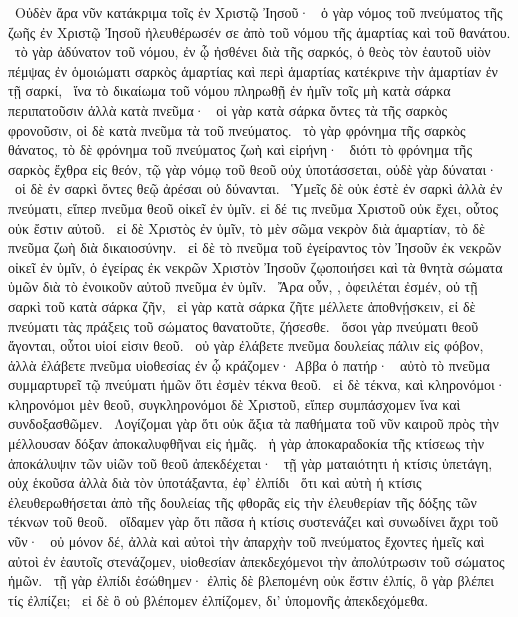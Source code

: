 ~Οὐδὲν ἄρα νῦν κατάκριμα τοῖς ἐν Χριστῷ Ἰησοῦ·
~ὁ γὰρ νόμος τοῦ πνεύματος τῆς ζωῆς ἐν Χριστῷ Ἰησοῦ ἠλευθέρωσέν σε ἀπὸ τοῦ νόμου τῆς ἁμαρτίας καὶ τοῦ θανάτου.
~τὸ γὰρ ἀδύνατον τοῦ νόμου, ἐν ᾧ ἠσθένει διὰ τῆς σαρκός, ὁ θεὸς τὸν ἑαυτοῦ υἱὸν πέμψας ἐν ὁμοιώματι σαρκὸς ἁμαρτίας καὶ περὶ ἁμαρτίας κατέκρινε τὴν ἁμαρτίαν ἐν τῇ σαρκί,
~ἵνα τὸ δικαίωμα τοῦ νόμου πληρωθῇ ἐν ἡμῖν τοῖς μὴ κατὰ σάρκα περιπατοῦσιν ἀλλὰ κατὰ πνεῦμα·
~οἱ γὰρ κατὰ σάρκα ὄντες τὰ τῆς σαρκὸς φρονοῦσιν, οἱ δὲ κατὰ πνεῦμα τὰ τοῦ πνεύματος.
~τὸ γὰρ φρόνημα τῆς σαρκὸς θάνατος, τὸ δὲ φρόνημα τοῦ πνεύματος ζωὴ καὶ εἰρήνη·
~διότι τὸ φρόνημα τῆς σαρκὸς ἔχθρα εἰς θεόν, τῷ γὰρ νόμῳ τοῦ θεοῦ οὐχ ὑποτάσσεται, οὐδὲ γὰρ δύναται·
~οἱ δὲ ἐν σαρκὶ ὄντες θεῷ ἀρέσαι οὐ δύνανται.
~Ὑμεῖς δὲ οὐκ ἐστὲ ἐν σαρκὶ ἀλλὰ ἐν πνεύματι, εἴπερ πνεῦμα θεοῦ οἰκεῖ ἐν ὑμῖν. εἰ δέ τις πνεῦμα Χριστοῦ οὐκ ἔχει, οὗτος οὐκ ἔστιν αὐτοῦ.
~εἰ δὲ Χριστὸς ἐν ὑμῖν, τὸ μὲν σῶμα νεκρὸν διὰ ἁμαρτίαν, τὸ δὲ πνεῦμα ζωὴ διὰ δικαιοσύνην.
~εἰ δὲ τὸ πνεῦμα τοῦ ἐγείραντος τὸν Ἰησοῦν ἐκ νεκρῶν οἰκεῖ ἐν ὑμῖν, ὁ ἐγείρας ἐκ νεκρῶν Χριστὸν Ἰησοῦν ζῳοποιήσει καὶ τὰ θνητὰ σώματα ὑμῶν διὰ τὸ ἐνοικοῦν αὐτοῦ πνεῦμα ἐν ὑμῖν.
~Ἄρα οὖν, , ὀφειλέται ἐσμέν, οὐ τῇ σαρκὶ τοῦ κατὰ σάρκα ζῆν,
~εἰ γὰρ κατὰ σάρκα ζῆτε μέλλετε ἀποθνῄσκειν, εἰ δὲ πνεύματι τὰς πράξεις τοῦ σώματος θανατοῦτε, ζήσεσθε.
~ὅσοι γὰρ πνεύματι θεοῦ ἄγονται, οὗτοι υἱοί εἰσιν θεοῦ.
~οὐ γὰρ ἐλάβετε πνεῦμα δουλείας πάλιν εἰς φόβον, ἀλλὰ ἐλάβετε πνεῦμα υἱοθεσίας ἐν ᾧ κράζομεν· Αββα ὁ πατήρ·
~αὐτὸ τὸ πνεῦμα συμμαρτυρεῖ τῷ πνεύματι ἡμῶν ὅτι ἐσμὲν τέκνα θεοῦ.
~εἰ δὲ τέκνα, καὶ κληρονόμοι· κληρονόμοι μὲν θεοῦ, συγκληρονόμοι δὲ Χριστοῦ, εἴπερ συμπάσχομεν ἵνα καὶ συνδοξασθῶμεν.
~Λογίζομαι γὰρ ὅτι οὐκ ἄξια τὰ παθήματα τοῦ νῦν καιροῦ πρὸς τὴν μέλλουσαν δόξαν ἀποκαλυφθῆναι εἰς ἡμᾶς.
~ἡ γὰρ ἀποκαραδοκία τῆς κτίσεως τὴν ἀποκάλυψιν τῶν υἱῶν τοῦ θεοῦ ἀπεκδέχεται·
~τῇ γὰρ ματαιότητι ἡ κτίσις ὑπετάγη, οὐχ ἑκοῦσα ἀλλὰ διὰ τὸν ὑποτάξαντα, ἐφ’ ἑλπίδι
~ὅτι καὶ αὐτὴ ἡ κτίσις ἐλευθερωθήσεται ἀπὸ τῆς δουλείας τῆς φθορᾶς εἰς τὴν ἐλευθερίαν τῆς δόξης τῶν τέκνων τοῦ θεοῦ.
~οἴδαμεν γὰρ ὅτι πᾶσα ἡ κτίσις συστενάζει καὶ συνωδίνει ἄχρι τοῦ νῦν·
~οὐ μόνον δέ, ἀλλὰ καὶ αὐτοὶ τὴν ἀπαρχὴν τοῦ πνεύματος ἔχοντες ἡμεῖς καὶ αὐτοὶ ἐν ἑαυτοῖς στενάζομεν, υἱοθεσίαν ἀπεκδεχόμενοι τὴν ἀπολύτρωσιν τοῦ σώματος ἡμῶν.
~τῇ γὰρ ἐλπίδι ἐσώθημεν· ἐλπὶς δὲ βλεπομένη οὐκ ἔστιν ἐλπίς, ὃ γὰρ βλέπει τίς ἐλπίζει;
~εἰ δὲ ὃ οὐ βλέπομεν ἐλπίζομεν, δι’ ὑπομονῆς ἀπεκδεχόμεθα.
